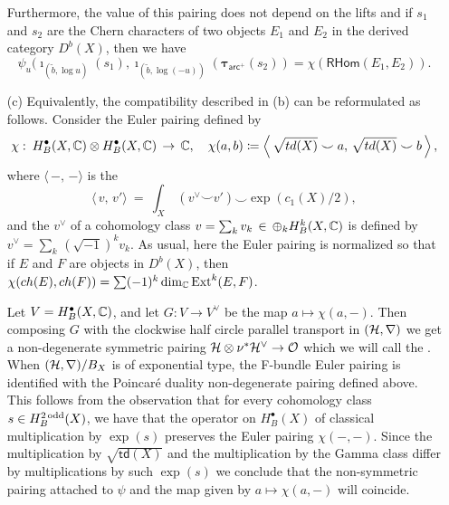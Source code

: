 \documentclass[twoside,leqno]{article}
\numberwithin{equation}{section}
\theoremstyle{plain}
\theoremstyle{definition}
\begin{document}
\begin{itemize}[wide]
\[\]
Furthermore, the value of this pairing does not depend on the lifts and if $s_{1}$ and $s_{2}$  are the Chern characters of two objects 
$E_{1}$ and $E_{2}$ in the derived category $D^{b}(X)$, then we have
\[\psi_{u}(\imath_{(\tilde{b},\log u)}(s_{1}),\imath_{(\tilde{b},\log (-u))}(\boldsymbol{\tau}_{\mathsf{arc}^{+}}(s_{2})) = \chi(\mathsf{RHom}(E_{1},E_{2})).\]
\item[(c)] Equivalently, the compatibility described in (b) can be reformulated as follows.
Consider the Euler pairing
defined by 
\[
\chi \, \colon \, H^{\bullet}_{B}(X,\mathbb C)\otimes H^{\bullet}_{B}(X,\mathbb C) \, \to \, \mathbb C, \quad \chi(a,b) \coloneqq \left\langle \, \sqrt{td(X)}\smile a,\, \sqrt{td(X)}\smile b\, \right\rangle,
\] 
where 
$\langle \, -,\, - \rangle$ is the  
\[
\langle\, v, \, v'\rangle \ = \ \int_{X} \, (v^{\vee} \smile v' )\smile \exp(c_{1}(X)/2),
\]
and the  $v^{\vee}$ of a cohomology class $v = \sum_{k} v_{k} \, \in \, \oplus_{k} H^{k}_{B}(X,\mathbb C)$ is defined by $v^{\vee} = \sum_{k} \, (\sqrt{-1})^{k} v_{k}$. 
As usual, here the Euler pairing is normalized so that if $E$ and $F$ are objects in $D^{b}(X)$, then $\chi(ch(E),ch(F)) = \sum (-1)^{k} \dim_{\mathbb C} \operatorname{Ext}^{k}(E,F)$.

\qquad Let $V = H^{\bullet}_{B}(X,\mathbb C)$, and let $G \colon V \to V^{\vee}$ be the map $a \mapsto \chi(a,-)$. Then composing $G$ with the clockwise half circle parallel transport in $(\mathcal H,\nabla)$ we get a non-degenerate symmetric pairing $\mathcal H\otimes\nu^{*}\mathcal H^{\vee} \to \mathcal O$  which we will call the . When $(\mathcal H,\nabla)/B_{X}$ is of exponential type,  the F-bundle Euler pairing is identified with the Poincar\'{e} duality non-degenerate pairing defined above. This follows from the observation that 
for every cohomology class 
$s \in H^{2\,\mathrm{odd}}_{B}(X)$, we have that the operator on $H^{\bullet}_{B}(X)$ of classical multiplication by $\exp(s)$ preserves the Euler pairing $\chi(-,-)$. Since the multiplication by $\sqrt{\mathsf{td}(X)}$ and the multiplication by the Gamma class differ by multiplications by such $\exp(s)$ we conclude that the non-symmetric pairing attached to $\psi$ and the map given by $a \mapsto \chi(a,-)$ will coincide. 




\end{itemize}
\end{document}
